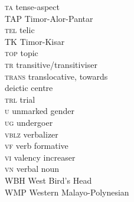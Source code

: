 \begin{multicols}{2}
\begin{tabbing}
 \textsc{ta}  \> tense-aspect \\
 \textsc{TAP}  \> Timor-Alor-Pantar \\
 \textsc{tel}  \> telic \\
 \textsc{TK}  \> Timor-Kisar \\
 \textsc{top}  \> topic \\
 \textsc{tr}  \> transitive\slash transitiviser \\
 \textsc{trans}  \> translocative, towards\\\> deictic centre \\
 \textsc{trl}  \> trial \\
 \textsc{u}  \> unmarked gender \\
 \textsc{ug}  \> undergoer \\
 \textsc{vblz}  \> verbalizer \\
 \textsc{vf}  \> verb formative \\
 \textsc{vi}  \> valency increaser \\
 \textsc{vn}  \> verbal noun \\
 \textsc{WBH}  \> West Bird's Head \\
 \textsc{WMP}  \> Western Malayo-Polynesian 
\end{tabbing}
\end{multicols}
